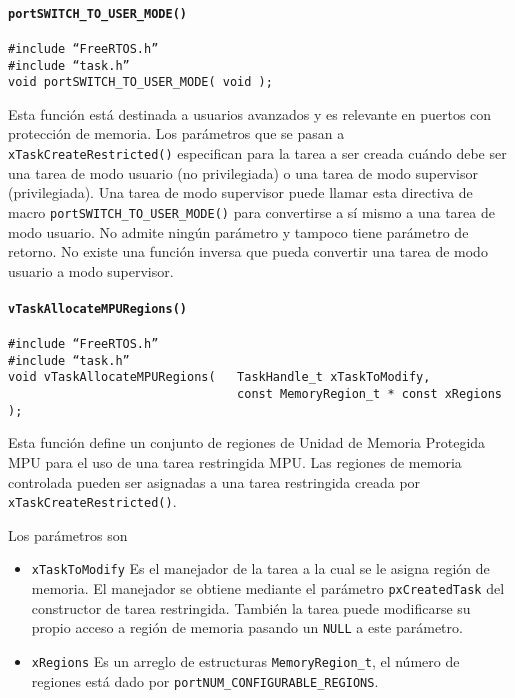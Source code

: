 \paragraph{\texttt{portSWITCH\_TO\_USER\_MODE()}}

\begin{verbatim}
#include “FreeRTOS.h”
#include “task.h”
void portSWITCH_TO_USER_MODE( void );
\end{verbatim}

Esta función está destinada a usuarios avanzados y es relevante en puertos con protección de memoria. Los parámetros que se pasan a \texttt{xTaskCreateRestricted()} especifican para la tarea a ser creada cuándo debe ser una tarea de modo usuario (no privilegiada) o una tarea de modo supervisor (privilegiada). Una tarea de modo supervisor puede llamar esta directiva de macro \texttt{portSWITCH\_TO\_USER\_MODE()} para convertirse a sí mismo a una tarea de modo usuario. No admite ningún parámetro y tampoco tiene parámetro de retorno. No existe una función inversa que pueda convertir una tarea de modo usuario a modo supervisor.

\paragraph{\texttt{vTaskAllocateMPURegions()}}

\begin{verbatim}
#include “FreeRTOS.h”
#include “task.h”
void vTaskAllocateMPURegions(   TaskHandle_t xTaskToModify,
                                const MemoryRegion_t * const xRegions );
\end{verbatim}

Esta función define un conjunto de regiones de Unidad de Memoria Protegida MPU para el uso de una tarea restringida MPU. Las regiones de memoria controlada pueden ser asignadas a una tarea restringida creada por \texttt{xTaskCreateRestricted()}.

Los parámetros son

\begin{itemize}
    \item \texttt{xTaskToModify} Es el manejador de la tarea a la cual se le asigna región de memoria. El manejador se obtiene mediante el parámetro \texttt{pxCreatedTask} del constructor de tarea restringida. También la tarea puede modificarse su propio acceso a región de memoria pasando un \texttt{NULL} a este parámetro.
    \item \texttt{xRegions} Es un arreglo de estructuras \texttt{MemoryRegion\_t}, el número de regiones está dado por \texttt{portNUM\_CONFIGURABLE\_REGIONS}.
\end{itemize}

